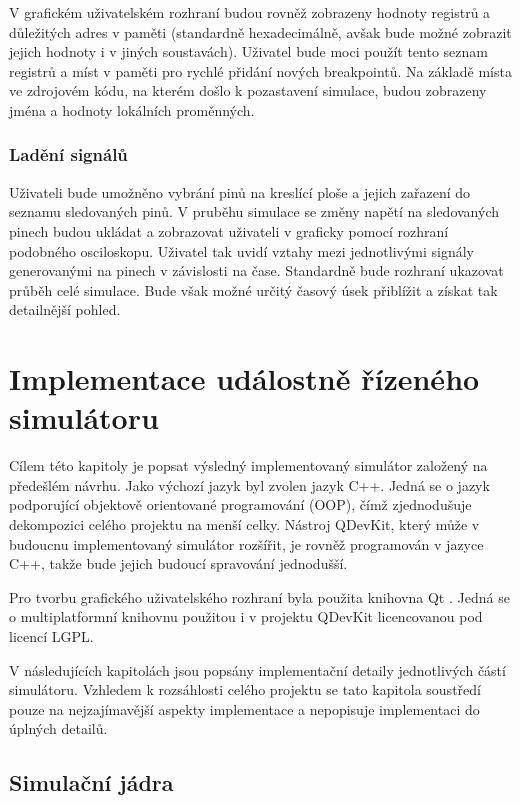 V grafickém uživatelském rozhraní budou rovněž zobrazeny hodnoty registrů a důležitých adres v paměti (standardně hexadecimálně, avšak bude možné zobrazit jejich hodnoty i v jiných soustavách). Uživatel bude moci použít tento seznam registrů a míst v paměti pro rychlé přidání nových breakpointů. Na základě místa ve zdrojovém kódu, na kterém došlo k pozastavení simulace, budou zobrazeny jména a hodnoty lokálních proměnných.

\subsection{Ladění signálů}

Uživateli bude umožněno vybrání pinů na kreslící ploše a jejich zařazení do seznamu sledovaných pinů. V pruběhu simulace se změny napětí na sledovaných pinech budou ukládat a zobrazovat uživateli v graficky pomocí rozhraní podobného osciloskopu. Uživatel tak uvidí vztahy mezi jednotlivými signály generovanými na pinech v závislosti na čase. Standardně bude rozhraní ukazovat průběh celé simulace. Bude však možné určitý časový úsek přiblížit a získat tak detailnější pohled.

\chapter{Implementace událostně řízeného simulátoru}

Cílem této kapitoly je popsat výsledný implementovaný simulátor založený na předešlém návrhu. Jako výchozí jazyk byl zvolen jazyk C++. Jedná se o jazyk podporující objektově orientované programování (OOP), čímž zjednodušuje dekompozici celého projektu na menší celky. Nástroj QDevKit, který může v budoucnu implementovaný simulátor rozšířit, je rovněž programován v jazyce C++, takže bude jejich budoucí spravování jednodušší.

Pro tvorbu grafického uživatelského rozhraní byla použita knihovna Qt \cite{qt}. Jedná se o multiplatformní knihovnu použitou i v projektu QDevKit licencovanou pod licencí LGPL.

V následujících kapitolách jsou popsány implementační detaily jednotlivých částí simulátoru. Vzhledem k rozsáhlosti celého projektu se tato kapitola soustředí pouze na nejzajímavější aspekty implementace a nepopisuje implementaci do úplných detailů.

\section{Simulační jádra}

